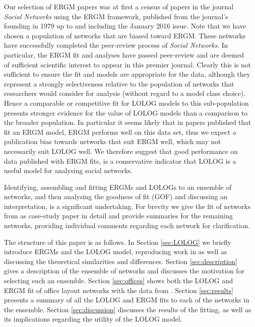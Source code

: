 \documentclass[
]{statsoc}
\begin{document}
Our selection of ERGM papers was at first a census of papers in the
journal \textit{Social Networks} using the ERGM framework, published
from the journal's founding in 1979 up to and including the January 2016
issue. Note that we have chosen a population of networks that are biased
toward ERGM. These networks have successfully completed the peer-review
process of \textit{Social Networks}. In particular, the ERGM fit and
analyses have passed peer-review and are deemed of sufficient scientific
interest to appear in this premier journal. Clearly this is not
sufficient to ensure the fit and models are appropriate for the data,
although they represent a strongly selectiveness relative to the
population of networks that researchers would consider for analysis
(without regard to a model class choice). Hence a comparable or
competitive fit for LOLOG models to this sub-population presents
stronger evidence for the value of LOLOG models than a comparison to the
broader population. In particular it seems likely that in papers
published that fit an ERGM model, ERGM performs well on this data set,
thus we expect a publication bias towards networks that suit ERGM well,
which may not necessarily suit LOLOG well. We therefore suggest that
good performance on data published with ERGM fits, is a conservative
indicator that LOLOG is a useful model for analysing social networks.

Identifying, assembling and fitting ERGMs and LOLOGs to an ensemble of
networks, and then analysing the goodness of fit (GOF) and discussing an
interpretation, is a significant undertaking. For brevity we give the
fit of networks from as case-study paper \cite{Sailer2012} in detail and
provide summaries for the remaining networks, providing individual
comments regarding each network for clarification.

The structure of this paper is as follows. In Section \ref{sec:LOLOG} we
briefly introduce ERGMs and the LOLOG model, reproducing work in
\cite{Fellows2018} as well as discussing the theoretical similarities
and differences. Section \ref{sec:description} gives a description of
the ensemble of networks and discusses the motivation for selecting such
an ensemble. Section \ref{sec:offices} shows both the LOLOG and ERGM fit
of office layout networks with the data from \cite{Sailer2012}. Section
\ref{sec:results} presents a summary of all the LOLOG and ERGM fits to
each of the networks in the ensemble. Section \ref{sec:discussion}
discusses the results of the fitting, as well as its implications
regarding the utility of the LOLOG model.
\end{document}
